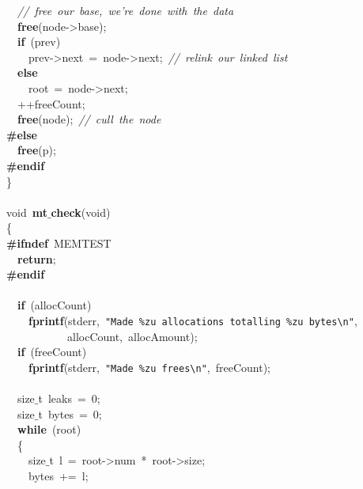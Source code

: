 \documentclass{article}
\begin{document}
\mbox{}\ \ \textit{//\ free\ our\ base,\ we're\ done\ with\ the\ data} \\
\mbox{}\ \ \textbf{free}(node-\textgreater{}base); \\
\mbox{}\ \ \textbf{if}\ (prev) \\
\mbox{}\ \ \ \ prev-\textgreater{}next\ =\ node-\textgreater{}next;\ \textit{//\ relink\ our\ linked\ list} \\
\mbox{}\ \ \textbf{else} \\
\mbox{}\ \ \ \ root\ =\ node-\textgreater{}next; \\
\mbox{}\ \ ++freeCount; \\
\mbox{}\ \ \textbf{free}(node);\ \textit{//\ cull\ the\ node} \\
\mbox{}\textbf{\#else} \\
\mbox{}\ \ \textbf{free}(p); \\
\mbox{}\textbf{\#endif} \\
\mbox{}\} \\
\mbox{} \\
\mbox{}void\ \textbf{mt$\_$check}(void) \\
\mbox{}\{ \\
\mbox{}\textbf{\#ifndef}\ MEMTEST \\
\mbox{}\ \ \textbf{return}; \\
\mbox{}\textbf{\#endif} \\
\mbox{} \\
\mbox{}\ \ \textbf{if}\ (allocCount) \\
\mbox{}\ \ \ \ \textbf{fprintf}(stderr,\ \texttt{"{}Made\ \%zu\ allocations\ totalling\ \%zu\ bytes}\texttt{\textbackslash{}n}\texttt{"{}}, \\
\mbox{}\ \ \ \ \ \ \ \ \ \ \ allocCount,\ allocAmount); \\
\mbox{}\ \ \textbf{if}\ (freeCount) \\
\mbox{}\ \ \ \ \textbf{fprintf}(stderr,\ \texttt{"{}Made\ \%zu\ frees}\texttt{\textbackslash{}n}\texttt{"{}},\ freeCount); \\
\mbox{} \\
\mbox{}\ \ size$\_$t\ leaks\ =\ 0; \\
\mbox{}\ \ size$\_$t\ bytes\ =\ 0; \\
\mbox{}\ \ \textbf{while}\ (root) \\
\mbox{}\ \ \{ \\
\mbox{}\ \ \ \ size$\_$t\ l\ =\ root-\textgreater{}num\ *\ root-\textgreater{}size; \\
\mbox{}\ \ \ \ bytes\ +=\ l; \\
\end{document}
